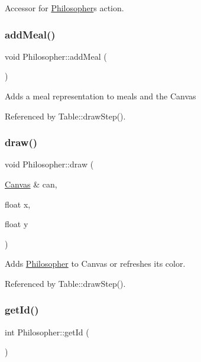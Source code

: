 Accessor for \hyperlink{class_philosopher}{Philosopher}\textquotesingle{}s action. \mbox{\label{class_philosopher_a5e5cfa25abdbca70a5d9ae725d8df7ea}} 
\subsubsection{\texorpdfstring{add\+Meal()}{addMeal()}}
{\footnotesize\ttfamily void Philosopher\+::add\+Meal (\begin{DoxyParamCaption}{ }\end{DoxyParamCaption})}

Adds a meal representation to meals and the Canvas 

Referenced by Table\+::draw\+Step().

\mbox{\label{class_philosopher_a0b49a5a22cd608ce3ac73211df0d3f45}} 
\subsubsection{\texorpdfstring{draw()}{draw()}}
{\footnotesize\ttfamily void Philosopher\+::draw (\begin{DoxyParamCaption}\item[{\hyperlink{classtsgl_1_1_canvas}{Canvas} \&}]{can,  }\item[{float}]{x,  }\item[{float}]{y }\end{DoxyParamCaption})}

Adds \hyperlink{class_philosopher}{Philosopher} to Canvas or refreshes its color. 

Referenced by Table\+::draw\+Step().

\mbox{\label{class_philosopher_adea5fd87303d0365985cb87c7666e452}} 
\subsubsection{\texorpdfstring{get\+Id()}{getId()}}
{\footnotesize\ttfamily int Philosopher\+::get\+Id (\begin{DoxyParamCaption}{ }\end{DoxyParamCaption})\hspace{0.3cm}{\ttfamily [inline]}}

